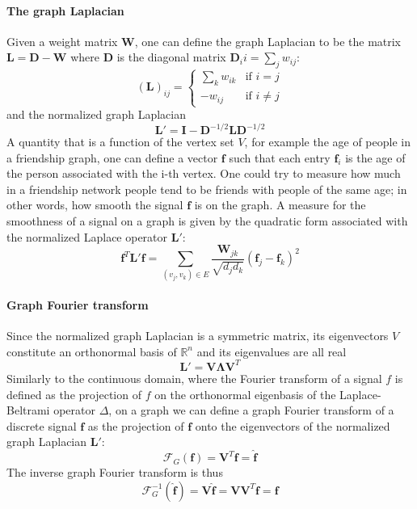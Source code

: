 \paragraph{The graph Laplacian}
Given a weight matrix $\mathbf W$, one can define the graph Laplacian to be the matrix $\mathbf L = \mathbf D-\mathbf W$ where $\mathbf D$ is the diagonal matrix $\mathbf D_ii = \sum_j w_{ij}$:
\begin{equation}\label{eq:graph Laplacian}
	(\mathbf{L})_{ij}=\begin{cases}
	\sum_k w_{ik} & \text{if }i=j\\
	-w_{ij}&\text{if }i\neq j
	\end{cases}
\end{equation}
and the normalized graph Laplacian
\begin{equation}\label{eq:normalized graph Laplacian}
\mathbf L' = \mathbf I - \mathbf D^{-1/2}\mathbf L\mathbf D^{-1/2}
\end{equation}
A quantity that is a function of the vertex set $V$, for example the age of people in a friendship graph, one can define a vector $\mathbf f$ such that each entry $\mathbf f_i$ is the age of the person associated with the i-th vertex. One could try to measure how much in a friendship network people tend to be friends with people of the same age; in other words, how smooth the signal $\mathbf f$ is on the graph. A measure for the smoothness of a signal on a graph is given by the quadratic form associated with the normalized Laplace operator $\mathbf L'$:
$$
\mathbf f^T \mathbf L' \mathbf f = \sum_{\left(v_{j}, v_{k}\right) \in {E}} \frac{\boldsymbol{W}_{j k}}{\sqrt{d_{j} {d}_{k}}}\left(\boldsymbol{f}_{j}-\boldsymbol{f}_{k}\right)^{2}
$$
\paragraph{Graph Fourier transform}
Since the normalized graph Laplacian is a symmetric matrix, its eigenvectors $V$ constitute an orthonormal basis of $\mathbb R^n$ and its eigenvalues are all real 
$$\mathbf L' = \mathbf V\mathbf \Lambda\mathbf V^T
$$
Similarly to the continuous domain, where the Fourier transform of a signal $f$ is defined as the projection of $f$ on the orthonormal eigenbasis of the Laplace-Beltrami operator $\Delta$, on a graph we can define a graph Fourier transform of a discrete signal $\mathbf f$ as the projection of $\mathbf f$ onto the eigenvectors of the normalized graph Laplacian $\mathbf L'$:
\begin{equation}\label{eq:graph fourier}
\mathcal F_G(\mathbf f) = \mathbf V^T\mathbf f = \hat{\mathbf f}
\end{equation}
The inverse graph Fourier transform is thus 
\begin{equation}\label{eq:graph fourier inverse}
\mathcal F^{-1}_G(\hat{\mathbf f}) = \mathbf V \hat{\mathbf f} = \mathbf V\mathbf V^T\mathbf f = {\mathbf f}
\end{equation}
